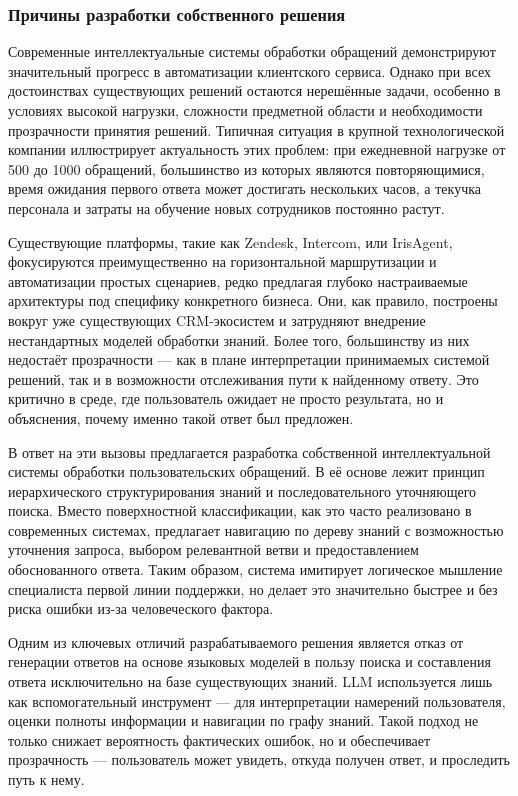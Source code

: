 \subsubsection{Причины разработки собственного решения}

Современные интеллектуальные системы обработки обращений демонстрируют значительный прогресс в автоматизации клиентского сервиса. Однако при всех достоинствах существующих решений остаются нерешённые задачи, особенно в условиях высокой нагрузки, сложности предметной области и необходимости прозрачности принятия решений. Типичная ситуация в крупной технологической компании иллюстрирует актуальность этих проблем: при ежедневной нагрузке от 500 до 1000 обращений, большинство из которых являются повторяющимися, время ожидания первого ответа может достигать нескольких часов, а текучка персонала и затраты на обучение новых сотрудников постоянно растут.

Существующие платформы, такие как Zendesk, Intercom, или IrisAgent, фокусируются преимущественно на горизонтальной маршрутизации и автоматизации простых сценариев, редко предлагая глубоко настраиваемые архитектуры под специфику конкретного бизнеса. Они, как правило, построены вокруг уже существующих CRM-экосистем и затрудняют внедрение нестандартных моделей обработки знаний. Более того, большинству из них недостаёт прозрачности — как в плане интерпретации принимаемых системой решений, так и в возможности отслеживания пути к найденному ответу. Это критично в среде, где пользователь ожидает не просто результата, но и объяснения, почему именно такой ответ был предложен.

В ответ на эти вызовы предлагается разработка собственной интеллектуальной системы обработки пользовательских обращений. В её основе лежит принцип иерархического структурирования знаний и последовательного уточняющего поиска. Вместо поверхностной классификации, как это часто реализовано в современных системах, предлагает навигацию по дереву знаний с возможностью уточнения запроса, выбором релевантной ветви и предоставлением обоснованного ответа. Таким образом, система имитирует логическое мышление специалиста первой линии поддержки, но делает это значительно быстрее и без риска ошибки из-за человеческого фактора.

Одним из ключевых отличий разрабатываемого решения является отказ от генерации ответов на основе языковых моделей в пользу поиска и составления ответа исключительно на базе существующих знаний. LLM используется лишь как вспомогательный инструмент — для интерпретации намерений пользователя, оценки полноты информации и навигации по графу знаний. Такой подход не только снижает вероятность фактических ошибок, но и обеспечивает прозрачность — пользователь может увидеть, откуда получен ответ, и проследить путь к нему.

